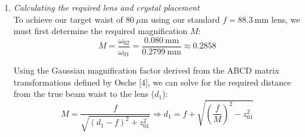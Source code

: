 \documentclass[11pt, letterpaper]{article}
\begin{document}
\begin{enumerate}
\begin{enumerate}
\item \textit{Calculating the required lens and crystal placement}\\
To achieve our target waist of $80~\mu\text{m}$ using our standard $f = 88.3~\text{mm}$ lens, we must first determine the required magnification $M$:
$$M = \frac{\omega_{02}}{\omega_{01}} = \frac{0.080~\text{mm}}{0.2799~\text{mm}} \approx 0.2858$$

Using the Gaussian magnification factor derived from the ABCD matrix transformations defined by Osche [4], we can solve for the required distance from the true beam waist to the lens ($d_1$):
$$M = \frac{f}{\sqrt{(d_1 - f)^2 + z_{01}^2}} \Rightarrow d_1 = f + \sqrt{\left(\frac{f}{M}\right)^2 - z_{01}^2}$$







\end{enumerate}
\end{enumerate}
\end{document}
